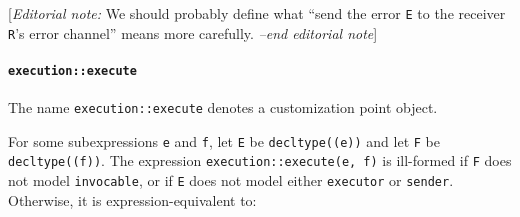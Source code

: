 \documentclass[a4paper,12pt,notitlepage,twoside,openright]{article}
\begin{document}
{[}\emph{Editorial note:} We should probably define what ``send the
error \texttt{E} to the receiver \texttt{R}'s
error channel'' means more carefully. \emph{--end editorial note}{]}

\hypertarget{executionexecute}{%
\paragraph{\texorpdfstring{\texttt{execution::execute}}{}}\label{executionexecute}}

The name \texttt{execution::execute} denotes a customization
point object.

For some subexpressions \texttt{e} and
\texttt{f}, let \texttt{E} be
\texttt{decltype((e))} and let \texttt{F} be
\texttt{decltype((f))}. The expression
\texttt{execution::execute(e, f)} is ill-formed if
\texttt{F} does not model \texttt{invocable}, or
if \texttt{E} does not model either
\texttt{executor} or \texttt{sender}. Otherwise,
it is expression-equivalent to:
\end{document}
